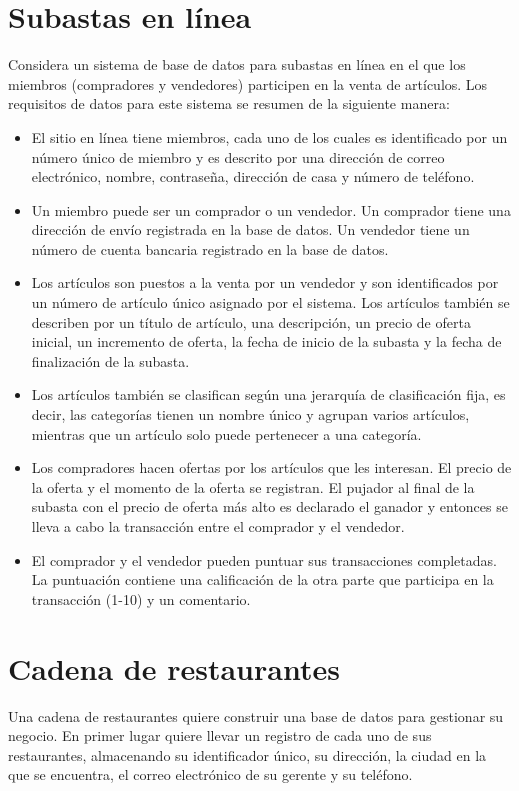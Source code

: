 \documentclass[a4paper]{article}
\begin{document}
\section{Subastas en línea}
Considera un sistema de base de datos para subastas en línea en el que los miembros (compradores y vendedores) participen en la venta de artículos. Los requisitos de datos para este sistema se resumen de la siguiente manera: 
\begin{itemize}
    \item El sitio en línea tiene miembros, cada uno de los cuales es identificado por un número único de miembro y es descrito por una dirección de correo electrónico, nombre, contraseña, dirección de casa y número de teléfono.
    \item Un miembro puede ser un comprador o un vendedor. Un comprador tiene una dirección de envío registrada en la base de datos. Un vendedor tiene un número de cuenta bancaria registrado en la base de datos.
    \item Los artículos son puestos a la venta por un vendedor y son identificados por un número de artículo único asignado por el sistema. Los artículos también se describen por un título de artículo, una descripción, un precio de oferta inicial, un incremento de oferta, la fecha de inicio de la subasta y la fecha de finalización de la subasta. 
    \item Los artículos también se clasifican según una jerarquía de clasificación fija, es decir, las categorías tienen un nombre único y agrupan varios artículos, mientras que un artículo solo puede pertenecer a una categoría.
    \item Los compradores hacen ofertas por los artículos que les interesan. El precio de la oferta y el momento de la oferta se registran. El pujador al final de la subasta con el precio de oferta más alto es declarado el ganador y entonces se lleva a cabo la transacción entre el comprador y el vendedor.
    \item El comprador y el vendedor pueden puntuar sus transacciones completadas. La puntuación contiene una calificación de la otra parte que participa en la transacción (1-10) y un comentario.
\end{itemize}

\section{Cadena de restaurantes}
Una cadena de restaurantes quiere construir una base de datos para gestionar su negocio. En primer lugar quiere llevar un registro de cada uno de sus restaurantes, almacenando su identificador único, su dirección, la ciudad en la que se encuentra, el correo electrónico de su gerente y su teléfono.
\end{document}
